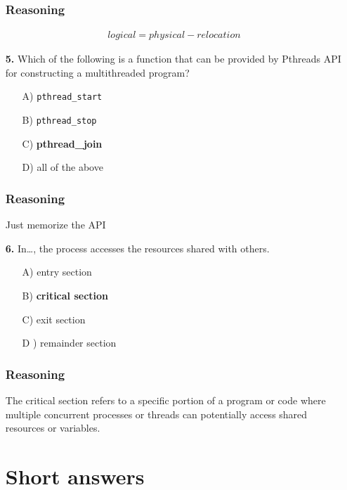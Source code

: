 \documentclass[12pt]{book}
\begin{document}
\begin{itemize}
        \subsection*{Reasoning}
        \begin{align*}
            logical=physical-relocation
        \end{align*}

        \item[\textbf{5.}] Which of the following is a function that can be provided by Pthreads API for constructing a multithreaded program?

        \begin{itemize}
            \item[A)] \texttt{pthread\_start}
            \item[B)] \texttt{pthread\_stop} 
            \item[C)] \textbf{pthread\_join}
            \item[D)] all of the above
        \end{itemize}

        \subsection*{Reasoning}
        Just memorize the API

        \item[\textbf{6.}] In\ldots, the process accesses the resources shared with others.
        \begin{itemize}
            \item[A)] entry section
            \item[B)] \textbf{critical section}
            \item[C)] exit section
            \item[D]) remainder section
        \end{itemize}
        \subsection*{Reasoning}
        The critical section refers to a specific portion of a program or code where multiple concurrent processes or threads can potentially access shared resources or variables.

        \chapter*{Short answers}


\end{itemize}
\end{document}
